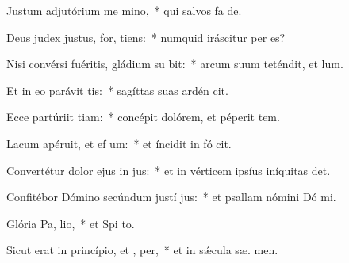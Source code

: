 \item Justum adjutórium me  mino,~* qui salvos fa  de.
\item Deus judex justus, for,  tiens:~* numquid iráscitur per  es?
\item Nisi convérsi fuéritis, gládium su bit:~* arcum suum teténdit, et  lum.
\item Et in eo parávit  tis:~* sagíttas suas ardén cit.
\item Ecce partúriit tiam:~* concépit dolórem, et péperit tem.
\item Lacum apéruit, et ef um:~* et íncidit in fó  cit.
\item Convertétur dolor ejus in  jus:~* et in vérticem ipsíus iníquitas  det.
\item Confitébor Dómino secúndum justí jus:~* et psallam nómini Dó mi.
\item Glória Pa,  lio,~* et Spi to.
\item Sicut erat in princípio, et ,  per,~* et in sǽcula sæ. men.
